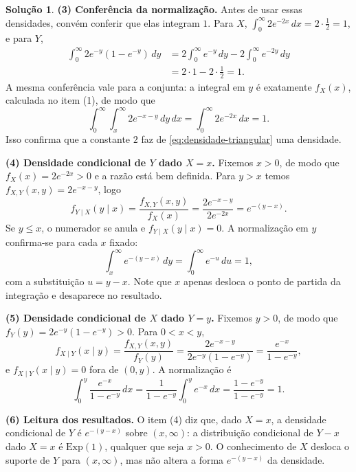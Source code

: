 \documentclass[12pt,portuguese]{article}
\theoremstyle{definition}
\theoremstyle{plainexercise}
\theoremstyle{starredexercise}
\theoremstyle{definition}
\newtheorem*{solution}{Solução}
\begin{document}
\begin{solution}
\smallskip
\noindent\textbf{(3) Conferência da normalização.}
Antes de usar essas densidades, convém conferir que elas integram $1$. Para $X$,
$\int_0^{\infty} 2e^{-2x}\,dx = 2 \cdot \frac{1}{2} = 1$, e para $Y$,
\begin{align*}
  \int_0^{\infty} 2e^{-y}\left(1 - e^{-y}\right)\,dy
  &= 2\int_0^{\infty} e^{-y}\,dy - 2\int_0^{\infty} e^{-2y}\,dy \\[0.3cm]
  &= 2 \cdot 1 - 2 \cdot \frac{1}{2} = 1.
\end{align*}
A mesma conferência vale para a conjunta: a integral em $y$ é exatamente $f_X(x)$, calculada
no item (1), de modo que
\[
  \int_0^{\infty}\int_x^{\infty} 2e^{-x-y}\,dy\,dx
  = \int_0^{\infty} 2e^{-2x}\,dx = 1.
\]
Isso confirma que a constante $2$ faz de \eqref{eq:densidade-triangular} uma densidade.

\smallskip
\noindent\textbf{(4) Densidade condicional de $Y$ dado $X = x$.}
Fixemos $x > 0$, de modo que $f_X(x) = 2e^{-2x} > 0$ e a razão está bem definida. Para
$y > x$ temos $f_{X,Y}(x,y) = 2e^{-x-y}$, logo
\begin{equation}\label{eq:condicional-y-dado-x}
  f_{Y\mid X}(y \mid x)
  = \frac{f_{X,Y}(x,y)}{f_X(x)}
  = \frac{2e^{-x-y}}{2e^{-2x}}
  = e^{-(y-x)}.
\end{equation}
Se $y \leqslant x$, o numerador se anula e $f_{Y\mid X}(y \mid x) = 0$. A normalização em
$y$ confirma-se para cada $x$ fixado:
\[
  \int_x^{\infty} e^{-(y-x)}\,dy = \int_0^{\infty} e^{-u}\,du = 1,
\]
com a substituição $u = y - x$. Note que $x$ apenas desloca o ponto de partida da
integração e desaparece no resultado.

\smallskip
\noindent\textbf{(5) Densidade condicional de $X$ dado $Y = y$.}
Fixemos $y > 0$, de modo que $f_Y(y) = 2e^{-y}(1 - e^{-y}) > 0$. Para $0 < x < y$,
\begin{equation}\label{eq:condicional-x-dado-y}
  f_{X\mid Y}(x \mid y)
  = \frac{f_{X,Y}(x,y)}{f_Y(y)}
  = \frac{2e^{-x-y}}{2e^{-y}\left(1 - e^{-y}\right)}
  = \frac{e^{-x}}{1 - e^{-y}},
\end{equation}
e $f_{X\mid Y}(x \mid y) = 0$ fora de $(0,y)$. A normalização é
\[
  \int_0^{y} \frac{e^{-x}}{1 - e^{-y}}\,dx
  = \frac{1}{1 - e^{-y}}\int_0^{y} e^{-x}\,dx
  = \frac{1 - e^{-y}}{1 - e^{-y}} = 1.
\]

\smallskip
\noindent\textbf{(6) Leitura dos resultados.}
O item (4) diz que, dado $X = x$, a densidade condicional de $Y$ é $e^{-(y-x)}$ sobre
$(x,\infty)$: a distribuição condicional de $Y-x$ dado $X=x$ é $\mathrm{Exp}(1)$,
qualquer que seja $x > 0$. O conhecimento de $X$
desloca o suporte de $Y$ para $(x,\infty)$, mas não altera a forma $e^{-(y-x)}$ da
densidade.


\end{solution}
\end{document}
